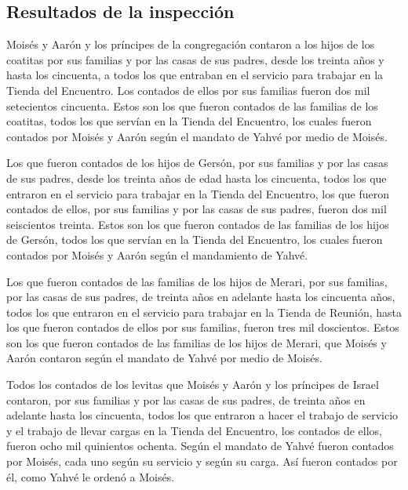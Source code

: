 \hypertarget{resultados-de-la-inspecciuxf3n}{%
\subsection{Resultados de la
inspección}\label{resultados-de-la-inspecciuxf3n}}

 Moisés y Aarón y los príncipes de la congregación
contaron a los hijos de los coatitas por sus familias y por las casas de
sus padres,  desde los treinta años y hasta los
cincuenta, a todos los que entraban en el servicio para trabajar en la
Tienda del Encuentro.  Los contados de ellos por sus
familias fueron dos mil setecientos cincuenta.  Estos son
los que fueron contados de las familias de los coatitas, todos los que
servían en la Tienda del Encuentro, los cuales fueron contados por
Moisés y Aarón según el mandato de Yahvé por medio de Moisés.

 Los que fueron contados de los hijos de Gersón, por sus
familias y por las casas de sus padres,  desde los
treinta años de edad hasta los cincuenta, todos los que entraron en el
servicio para trabajar en la Tienda del Encuentro,  los
que fueron contados de ellos, por sus familias y por las casas de sus
padres, fueron dos mil seiscientos treinta.  Estos son
los que fueron contados de las familias de los hijos de Gersón, todos
los que servían en la Tienda del Encuentro, los cuales fueron contados
por Moisés y Aarón según el mandamiento de Yahvé.

 Los que fueron contados de las familias de los hijos de
Merari, por sus familias, por las casas de sus padres, 
de treinta años en adelante hasta los cincuenta años, todos los que
entraron en el servicio para trabajar en la Tienda de Reunión,
 hasta los que fueron contados de ellos por sus familias,
fueron tres mil doscientos.  Estos son los que fueron
contados de las familias de los hijos de Merari, que Moisés y Aarón
contaron según el mandato de Yahvé por medio de Moisés.

 Todos los contados de los levitas que Moisés y Aarón y
los príncipes de Israel contaron, por sus familias y por las casas de
sus padres,  de treinta años en adelante hasta los
cincuenta, todos los que entraron a hacer el trabajo de servicio y el
trabajo de llevar cargas en la Tienda del Encuentro,  los
contados de ellos, fueron ocho mil quinientos ochenta. 
Según el mandato de Yahvé fueron contados por Moisés, cada uno según su
servicio y según su carga. Así fueron contados por él, como Yahvé le
ordenó a Moisés.


